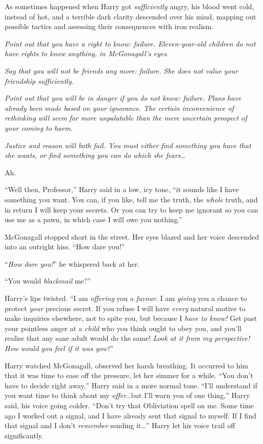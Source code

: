 As sometimes happened when Harry got \emph{sufficiently} angry, his blood went cold, instead of hot, and a terrible dark clarity descended over his mind, mapping out possible tactics and assessing their consequences with iron realism.

\emph{Point out that you have a right to know: failure. Eleven-year-old children do not have rights to know anything, in McGonagall’s eyes.}

\emph{Say that you will not be friends any more: failure. She does not value your friendship sufficiently.}

\emph{Point out that you will be in danger if you do not know: failure. Plans have already been made based on your ignorance. The \emph{certain} inconvenience of rethinking will seem far more unpalatable than the mere \emph{uncertain} prospect of your coming to harm.}

\emph{Justice and reason will both fail. You must either find something you have that she wants, or find something you can do which she fears…}

Ah.

“Well then, Professor,” Harry said in a low, icy tone, “it sounds like I have something you want. You can, if you like, tell me the truth, the \emph{whole} truth, and in return I will keep your secrets. Or you can try to keep me ignorant so you can use me as a pawn, in which case I will owe you nothing.”

McGonagall stopped short in the street. Her eyes blazed and her voice descended into an outright hiss. “How dare you!”

“\emph{How dare you!}” he whispered back at her.

“You would \emph{blackmail} me?”

Harry’s lips twisted. “I am \emph{offering} you a \emph{favour.} I am \emph{giving} you a chance to protect \emph{your} precious secret. If you refuse I will have \emph{every} natural motive to make inquiries elsewhere, not to spite you, but because I \emph{have to know!} Get past your pointless anger at a \emph{child} who you think ought to obey you, and you’ll realise that any sane adult would do the same! \emph{Look at it from my perspective! How would you feel if it was \emph{you?}}”

Harry watched McGonagall, observed her harsh breathing. It occurred to him that it was time to ease off the pressure, let her simmer for a while. “You don’t have to decide right away,” Harry said in a more normal tone. “I’ll understand if you want time to think about my \emph{offer}…but I’ll warn you of one thing,” Harry said, his voice going colder. “Don’t try that Obliviation spell on me. Some time ago I worked out a signal, and I have already sent that signal to myself. If I find that signal and I don’t \emph{remember} sending it…” Harry let his voice trail off significantly.

